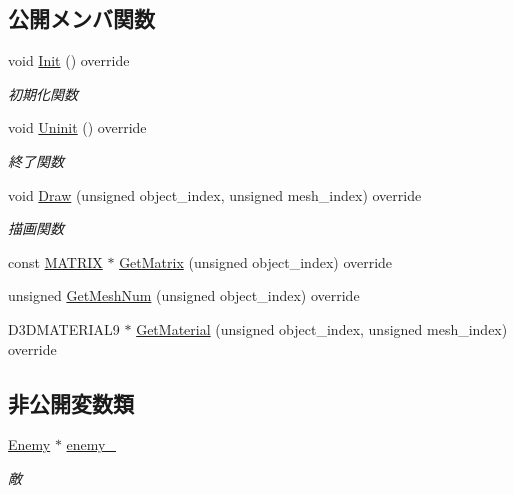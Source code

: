\subsection*{公開メンバ関数}
\begin{DoxyCompactItemize}
\item 
void \mbox{\hyperlink{class_enemy_draw_aa1659c35fa757db6a6cf07e26ad9ddfb}{Init}} () override
\begin{DoxyCompactList}\small\item\em 初期化関数 \end{DoxyCompactList}\item 
void \mbox{\hyperlink{class_enemy_draw_a2861dc0623b0be7726bc69a6a469190e}{Uninit}} () override
\begin{DoxyCompactList}\small\item\em 終了関数 \end{DoxyCompactList}\item 
void \mbox{\hyperlink{class_enemy_draw_a20a23c1c5fd5e510d15e8ca27aabd821}{Draw}} (unsigned object\+\_\+index, unsigned mesh\+\_\+index) override
\begin{DoxyCompactList}\small\item\em 描画関数 \end{DoxyCompactList}\item 
const \mbox{\hyperlink{_vector3_d_8h_a032295cd9fb1b711757c90667278e744}{M\+A\+T\+R\+IX}} $\ast$ \mbox{\hyperlink{class_enemy_draw_a6f2a052a45caf0d255112cbe81b8bfa3}{Get\+Matrix}} (unsigned object\+\_\+index) override
\item 
unsigned \mbox{\hyperlink{class_enemy_draw_acda1a2487aea432b08fc816351a12239}{Get\+Mesh\+Num}} (unsigned object\+\_\+index) override
\item 
D3\+D\+M\+A\+T\+E\+R\+I\+A\+L9 $\ast$ \mbox{\hyperlink{class_enemy_draw_a12f00116f7fa97e07317a949d5c27bb4}{Get\+Material}} (unsigned object\+\_\+index, unsigned mesh\+\_\+index) override
\end{DoxyCompactItemize}
\subsection*{非公開変数類}
\begin{DoxyCompactItemize}
\item 
\mbox{\hyperlink{class_enemy}{Enemy}} $\ast$ \mbox{\hyperlink{class_enemy_draw_a95b8a7f07e810d1347f1704669c8f790}{enemy\+\_\+}}
\begin{DoxyCompactList}\small\item\em 敵 \end{DoxyCompactList}\end{DoxyCompactItemize}


